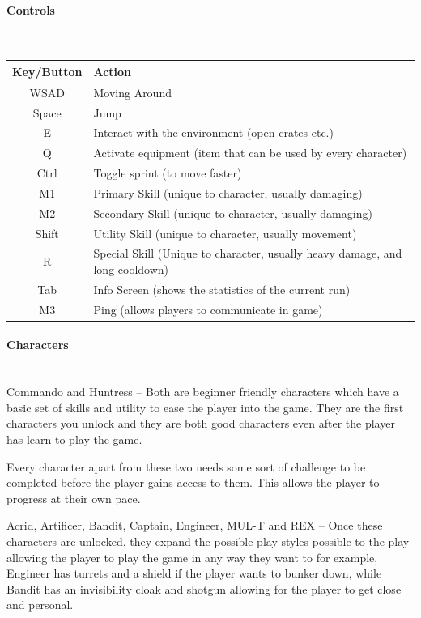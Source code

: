 \documentclass{article}
\newcommand{\parBr}{\vspace{5mm}}%
\newcommand{\myparagraph}[1]{\paragraph{#1}\mbox{}\\} %
\newcommand{\smallBr}{\vspace{1.5mm}}
\begin{document}
\myparagraph{Controls}
\smallBr
\begin{tabular}{c|l}
Key/Button & Action                                                                       \\ \hline
WSAD       & Moving Around                                                                \\
Space      & Jump                                                                         \\
E          & Interact with the environment (open crates etc.)                             \\
Q          & Activate equipment (item that can be used by every character)                \\
Ctrl       & Toggle sprint (to move faster)                                               \\
M1         & Primary Skill (unique to character, usually damaging)                        \\
M2         & Secondary Skill (unique to character, usually damaging)                      \\
Shift      & Utility Skill (unique to character, usually movement)                        \\
R          & Special Skill (Unique to character, usually heavy damage, and long cooldown) \\
Tab        & Info Screen (shows the statistics of the current run)                        \\
M3         & Ping (allows players to communicate in game)                                
\end{tabular}

\myparagraph{Characters}
Commando and Huntress – Both are beginner friendly characters which have a basic set of skills and utility to ease the player into the game. They are the first characters you unlock and they are both good characters even after the player has learn to play the game. 

\parBr

Every character apart from these two needs some sort of challenge to be completed before the player gains access to them. This allows the player to progress at their own pace. 

\parBr

Acrid, Artificer, Bandit, Captain, Engineer, MUL-T and REX – Once these characters are unlocked, they expand the possible play styles possible to the play allowing the player to play the game in any way they want to for example, Engineer has turrets and a shield if the player wants to bunker down, while Bandit has an invisibility cloak and shotgun allowing for the player to get close and personal. 
\end{document}
